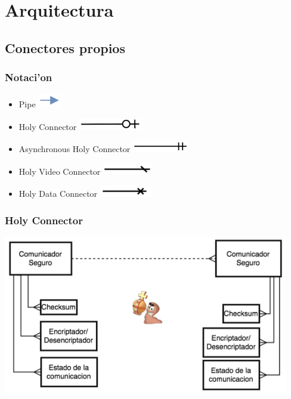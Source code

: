 \section{Arquitectura}
\subsection{Conectores propios}
\subsubsection{Notaci'on}

\begin{itemize}
\item Pipe \includegraphics[height=0.6cm]{diagramas/NPIPE} 
\item Holy Connector \includegraphics[height=0.5cm]{diagramas/NHC} 
\item Asynchronous Holy Connector \includegraphics[height=0.5cm]{diagramas/NHCCA}
\item Holy Video Connector \includegraphics[height=0.5cm]{diagramas/NHVC} 
\item Holy Data Connector \includegraphics[height=0.5cm]{diagramas/NHDC} 

\end{itemize}

\subsubsection{Holy Connector}

\begin{center}
	\includegraphics[height=7cm]{diagramas/HC} 
\end{center}

